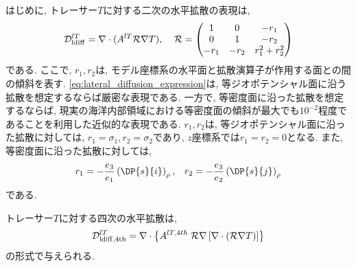 はじめに, トレーサー$T$に対する二次の水平拡散の表現は,  
\begin{equation}
 \mathcal{D}^{lT}_{\rm ldiff} = \nabla\cdot (A^{lT} \mathcal{R} \nabla T), 
 \;\;\;\; 
 \mathcal{R} =
\begin{pmatrix}
  1 &0 &-r_1              \\
  0 &1 &-r_2               \\
  -r_1 &-r_2 &r_1^2 + r_2^2
\end{pmatrix}
\label{eq:lateral_diffusion_expression}
\end{equation}
である. 
ここで, $r_1, r_2$は, モデル座標系の水平面と拡散演算子が作用する面との間の傾斜を表す. 
\eqref{eq:lateral_diffusion_expression}は, 等ジオポテンシャル面に沿う拡散を想定するならば厳密な表現である. 
一方で, 等密度面に沿った拡散を想定するならば, 
現実の海洋内部領域における等密度面の傾斜が最大でも$10^{-2}$程度であることを利用した近似的な表現である\citep{redi1982oceanic}. 
$r_1, r_2$は, 等ジオポテンシャル面に沿った拡散に対しては, 
$r_1=\sigma_1, r_2=\sigma_2$であり, $z$座標系では$r_1=r_2=0$となる. 
また, 等密度面に沿った拡散に対しては, 
\begin{equation*}
  r_1 = - \dfrac{e_3}{e_1} \left(\DP{s}{i}\right)_\rho, \;\;\;
  r_2 = - \dfrac{e_3}{e_2} \left(\DP{s}{j}\right)_\rho
\end{equation*}
である. 

トレーサー$T$に対する四次の水平拡散は, 
\begin{equation*}
 \mathcal{D}^{lT}_{\rm ldiff,4th} = 
   \nabla \cdot \left\{  A^{lT,4th} \; \mathcal{R} \nabla
       \left[ \nabla \cdot  (\mathcal{R} \nabla T) \right]
    \right\}
\end{equation*}
の形式で与えられる. 

